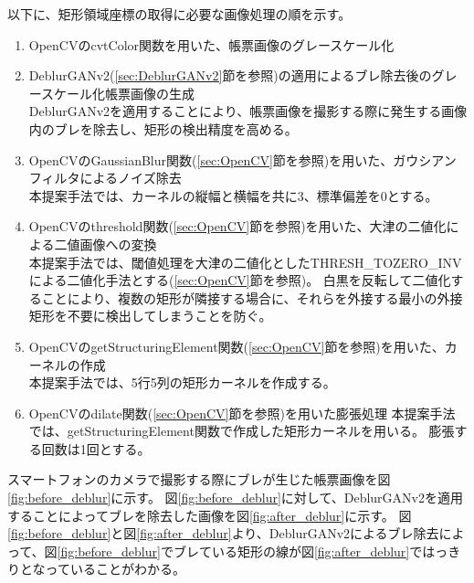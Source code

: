 以下に、矩形領域座標の取得に必要な画像処理の順を示す。

\begin{enumerate}
    \item OpenCVのcvtColor関数を用いた、帳票画像のグレースケール化
    \item DeblurGANv2(\ref{sec:DeblurGANv2}節を参照)の適用によるブレ除去後のグレースケール化帳票画像の生成\\
        DeblurGANv2を適用することにより、帳票画像を撮影する際に発生する画像内のブレを除去し、矩形の検出精度を高める。
    \item OpenCVのGaussianBlur関数(\ref{sec:OpenCV}節を参照)を用いた、ガウシアンフィルタによるノイズ除去\\
        本提案手法では、カーネルの縦幅と横幅を共に3、標準偏差を0とする。
    \item OpenCVのthreshold関数(\ref{sec:OpenCV}節を参照)を用いた、大津の二値化による二値画像への変換\\
        本提案手法では、閾値処理を大津の二値化としたTHRESH\_TOZERO\_INVによる二値化手法とする(\ref{sec:OpenCV}節を参照)。
        白黒を反転して二値化することにより、複数の矩形が隣接する場合に、それらを外接する最小の外接矩形を不要に検出してしまうことを防ぐ。
    \item OpenCVのgetStructuringElement関数(\ref{sec:OpenCV}節を参照)を用いた、カーネルの作成\\
        本提案手法では、5行5列の矩形カーネルを作成する。
    \item OpenCVのdilate関数(\ref{sec:OpenCV}節を参照)を用いた膨張処理
        本提案手法では、getStructuringElement関数で作成した矩形カーネルを用いる。
        膨張する回数は1回とする。
\end{enumerate}

スマートフォンのカメラで撮影する際にブレが生じた帳票画像を図\ref{fig:before_deblur}に示す。
図\ref{fig:before_deblur}に対して、DeblurGANv2を適用することによってブレを除去した画像を図\ref{fig:after_deblur}に示す。
図\ref{fig:before_deblur}と図\ref{fig:after_deblur}より、DeblurGANv2によるブレ除去によって、図\ref{fig:before_deblur}でブレている矩形の線が図\ref{fig:after_deblur}ではっきりとなっていることがわかる。


